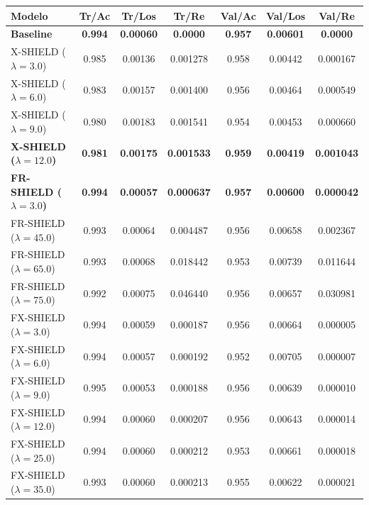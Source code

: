 \begin{table}[htbp]
\centering
{} %
\setlength{\arrayrulewidth}{0.8pt} %
\begin{tabular}{|l|cccccc|}
\hline
\rowcolor{gray!50} Modelo & Tr/Ac & Tr/Los & Tr/Re & Val/Ac & Val/Los & Val/Re \\
\hline
\textbf{Baseline} & \textbf{0.994} & \textbf{0.00060} & \textbf{0.0000} & \textbf{0.957} & \textbf{0.00601} & \textbf{0.0000} \\
\hline
\rowcolor{gray!10} X-SHIELD ($\lambda = 3.0$) & 0.985 & 0.00136 & 0.001278 & 0.958 & 0.00442 & 0.000167 \\
\rowcolor{gray!10} X-SHIELD ($\lambda = 6.0$) & 0.983 & 0.00157 & 0.001400 & 0.956 & 0.00464 & 0.000549 \\
\rowcolor{gray!10} X-SHIELD ($\lambda = 9.0$) & 0.980 & 0.00183 & 0.001541 & 0.954 & 0.00453 & 0.000660 \\
\rowcolor{gray!10} \textbf{X-SHIELD ($\lambda = 12.0$)} & \textbf{0.981} & \textbf{0.00175} & \textbf{0.001533} & \textbf{0.959} & \textbf{0.00419} & \textbf{0.001043} \\
\hline
\textbf{FR-SHIELD ($\lambda = 3.0$)} & \textbf{0.994} & \textbf{0.00057} & \textbf{0.000637} & \textbf{0.957} & \textbf{0.00600} & \textbf{0.000042} \\
FR-SHIELD ($\lambda = 45.0$) & 0.993 & 0.00064 & 0.004487 & 0.956 & 0.00658 & 0.002367 \\
FR-SHIELD ($\lambda = 65.0$) & 0.993 & 0.00068 & 0.018442 & 0.953 & 0.00739 & 0.011644 \\
FR-SHIELD ($\lambda = 75.0$) & 0.992 & 0.00075 & 0.046440 & 0.956 & 0.00657 & 0.030981 \\
\hline
\rowcolor{gray!10} FX-SHIELD ($\lambda = 3.0$) & 0.994 & 0.00059 & 0.000187 & 0.956 & 0.00664 & 0.000005 \\
\rowcolor{gray!10} FX-SHIELD ($\lambda = 6.0$) & 0.994 & 0.00057 & 0.000192 & 0.952 & 0.00705 & 0.000007 \\
\rowcolor{gray!10} FX-SHIELD ($\lambda = 9.0$) & 0.995 & 0.00053 & 0.000188 & 0.956 & 0.00639 & 0.000010 \\
\rowcolor{gray!10} FX-SHIELD ($\lambda = 12.0$) & 0.994 & 0.00060 & 0.000207 & 0.956 & 0.00643 & 0.000014 \\
\rowcolor{gray!10} FX-SHIELD ($\lambda = 25.0$) & 0.994 & 0.00060 & 0.000212 & 0.953 & 0.00661 & 0.000018 \\
\rowcolor{gray!10} FX-SHIELD ($\lambda = 35.0$) & 0.993 & 0.00060 & 0.000213 & 0.955 & 0.00622 & 0.000021 \\

\end{tabular}
\end{table}
